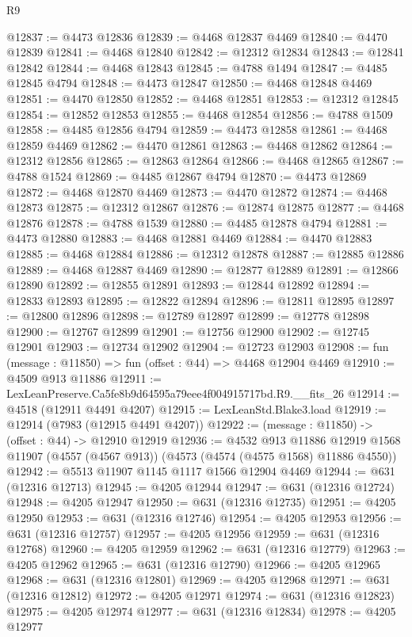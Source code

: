 \begin{lexlean}{R9}
\begin{coremodule}
@12837 := @4473 @12836
@12839 := @4468 @12837 @4469
@12840 := @4470 @12839
@12841 := @4468 @12840
@12842 := @12312 @12834
@12843 := @12841 @12842
@12844 := @4468 @12843
@12845 := @4788 @1494
@12847 := @4485 @12845 @4794
@12848 := @4473 @12847
@12850 := @4468 @12848 @4469
@12851 := @4470 @12850
@12852 := @4468 @12851
@12853 := @12312 @12845
@12854 := @12852 @12853
@12855 := @4468 @12854
@12856 := @4788 @1509
@12858 := @4485 @12856 @4794
@12859 := @4473 @12858
@12861 := @4468 @12859 @4469
@12862 := @4470 @12861
@12863 := @4468 @12862
@12864 := @12312 @12856
@12865 := @12863 @12864
@12866 := @4468 @12865
@12867 := @4788 @1524
@12869 := @4485 @12867 @4794
@12870 := @4473 @12869
@12872 := @4468 @12870 @4469
@12873 := @4470 @12872
@12874 := @4468 @12873
@12875 := @12312 @12867
@12876 := @12874 @12875
@12877 := @4468 @12876
@12878 := @4788 @1539
@12880 := @4485 @12878 @4794
@12881 := @4473 @12880
@12883 := @4468 @12881 @4469
@12884 := @4470 @12883
@12885 := @4468 @12884
@12886 := @12312 @12878
@12887 := @12885 @12886
@12889 := @4468 @12887 @4469
@12890 := @12877 @12889
@12891 := @12866 @12890
@12892 := @12855 @12891
@12893 := @12844 @12892
@12894 := @12833 @12893
@12895 := @12822 @12894
@12896 := @12811 @12895
@12897 := @12800 @12896
@12898 := @12789 @12897
@12899 := @12778 @12898
@12900 := @12767 @12899
@12901 := @12756 @12900
@12902 := @12745 @12901
@12903 := @12734 @12902
@12904 := @12723 @12903
@12908 := fun (message : @11850) => fun (offset : @44) => @4468 @12904 @4469
@12910 := @4509 @913 @11886
@12911 := LexLeanPreserve.Ca5fe8b9d64595a79eee4f004915717bd.R9.__fits_26
@12914 := @4518 (@12911 @4491 @4207)
@12915 := LexLeanStd.Blake3.load
@12919 := @12914 (@7983 (@12915 @4491 @4207))
@12922 := (message : @11850) -> (offset : @44) -> @12910 @12919
@12936 := @4532
    @913
    @11886
    @12919
    @1568
    @11907
    (@4557 (@4567 @913))
    (@4573 (@4574 (@4575 @1568) @11886 @4550))
@12942 := @5513 @11907 @1145 @1117 @1566 @12904 @4469
@12944 := @631 (@12316 @12713)
@12945 := @4205 @12944
@12947 := @631 (@12316 @12724)
@12948 := @4205 @12947
@12950 := @631 (@12316 @12735)
@12951 := @4205 @12950
@12953 := @631 (@12316 @12746)
@12954 := @4205 @12953
@12956 := @631 (@12316 @12757)
@12957 := @4205 @12956
@12959 := @631 (@12316 @12768)
@12960 := @4205 @12959
@12962 := @631 (@12316 @12779)
@12963 := @4205 @12962
@12965 := @631 (@12316 @12790)
@12966 := @4205 @12965
@12968 := @631 (@12316 @12801)
@12969 := @4205 @12968
@12971 := @631 (@12316 @12812)
@12972 := @4205 @12971
@12974 := @631 (@12316 @12823)
@12975 := @4205 @12974
@12977 := @631 (@12316 @12834)
@12978 := @4205 @12977

\end{coremodule}
\end{lexlean}
